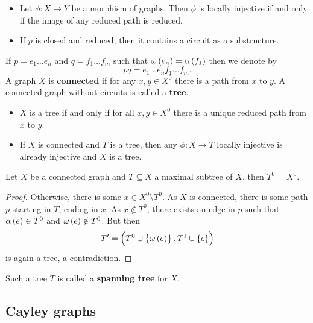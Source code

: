 \pagebreak

\begin{exercise}
\hfill
\begin{itemize}
\item Let $ \phi : X \to Y $ be a morphism of graphs. Then $ \phi $ is locally injective if and only if the image of any reduced path is reduced.
\item If $ p $ is closed and reduced, then it contains a circuit as a substructure.
\end{itemize}
\end{exercise}

If $ p = e_1 \dots e_n $ and $ q = f_1 \dots f_m $ such that $ \omega\br{e_n} = \alpha\br{f_1} $ then we denote by
$$ pq = e_1 \dots e_nf_1 \dots f_m. $$
A graph $ X $ is \textbf{connected} if for any $ x, y \in X^0 $ there is a path from $ x $ to $ y $. A connected graph without circuits is called a \textbf{tree}.

\begin{exercise}
\hfill
\begin{itemize}
\item $ X $ is a tree if and only if for all $ x, y \in X^0 $ there is a unique reduced path from $ x $ to $ y $.
\item If $ X $ is connected and $ T $ is a tree, then any $ \phi : X \to T $ locally injective is already injective and $ X $ is a tree.
\end{itemize}
\end{exercise}

\begin{lemma}
Let $ X $ be a connected graph and $ T \subseteq X $ a maximal subtree of $ X $, then $ T^0 = X^0 $.
\end{lemma}

\begin{proof}
Otherwise, there is some $ x \in X^0 \setminus T^0 $. As $ X $ is connected, there is some path $ p $ starting in $ T $, ending in $ x $. As $ x \notin T^0 $, there exists an edge in $ p $ such that $ \alpha\br{e} \in T^0 $ and $ \omega\br{e} \notin T^0 $. But then
$$ T' = \br{T^0 \cup \cbr{\omega\br{e}}, T^1 \cup \cbr{e}} $$
is again a tree, a contradiction.
\end{proof}

Such a tree $ T $ is called a \textbf{spanning tree} for $ X $.

\subsection{Cayley graphs}

